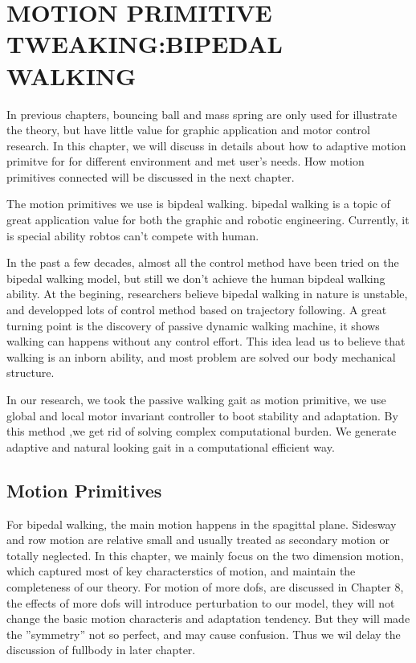 \chapter{MOTION PRIMITIVE TWEAKING:BIPEDAL WALKING}
\label{chap:walk}

\ifpdf
    \graphicspath{{BipedWalk/BipedWalkFigs/PNG/}{BipedWalk/BipedWalkFigs/PDF/}{BipedWalk/BipedWalkFigs/}}
\else
    \graphicspath{{BipedWalk/BipedWalkFigs/EPS/}{BipedWalk/BipedWalkFigs/}}
\fi

In previous chapters, bouncing ball and mass spring are only used for illustrate the theory, but have little value for graphic application and motor control research.
In this chapter, we will discuss in details about how to adaptive motion primitve for for different environment and met user's needs.
How motion primitives connected will be discussed in the next chapter.


The motion primitives we use is bipdeal walking.
bipedal walking is a topic of great application value for both the graphic and robotic engineering.
Currently, it is special ability robtos can't compete with human.

In the past a few decades, almost all the control method have been tried on the bipedal walking model, but still we don't achieve the human bipdeal walking ability.
At the begining, researchers believe bipedal walking in nature is unstable, and developped lots of control method based on trajectory following.
A great turning point is the discovery of passive dynamic walking machine, it shows walking can happens without any control effort.
This idea lead us to believe that walking is an inborn ability, and most problem are solved our body mechanical structure.

In our research, we took the passive walking gait as motion primitive, we use global and local motor invariant controller to boot stability and adaptation.
By this method ,we get rid of solving complex computational burden.
We generate adaptive and natural looking gait in a computational efficient way.


\section{Motion Primitives}


For bipedal walking, the main motion happens in the spagittal plane.
Sidesway and row motion are relative small and usually treated as secondary motion or totally neglected.
In this chapter, we mainly focus on the two dimension motion, which captured most of key characterstics of motion, and maintain the completeness of our theory.
For motion of more dofs, are discussed in Chapter 8, the effects of more dofs will introduce perturbation to our model, they will not change the basic motion characteris and adaptation tendency.
But they will made the ''symmetry'' not so perfect, and may cause confusion.
Thus we wil delay the discussion of fullbody in later chapter.

